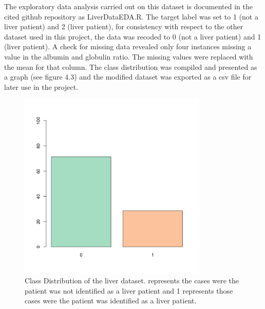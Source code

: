 The exploratory data analysis carried out on this dataset is documented in the cited github repository as LiverDataEDA.R.\newline
The target label was set to 1 (not a liver patient) and 2 (liver patient), for consistency with respect to the other dataset used in this project, the data was recoded to 0 (not a liver patient) and 1 (liver patient).\newline
A check for missing data revealed only four instances missing a value in the albumin and globulin ratio. The missing values were replaced with the mean for that column.
The class distribution was compiled and presented as a graph (see figure 4.3) and the modified dataset was exported as a csv file for later use in the project.

\begin{figure}[H]
    \centering
    \includegraphics[width=0.8\textwidth]{ThesisTemplate/usingLatex/chapter4Images/figure4_6.png}
    \caption{Class Distribution of the liver dataset. represents the cases were the patient was not identified as a liver patient and 1 represents those cases were the patient was identified as a liver patient.}
    \label{fig:my_label}
\end{figure}

